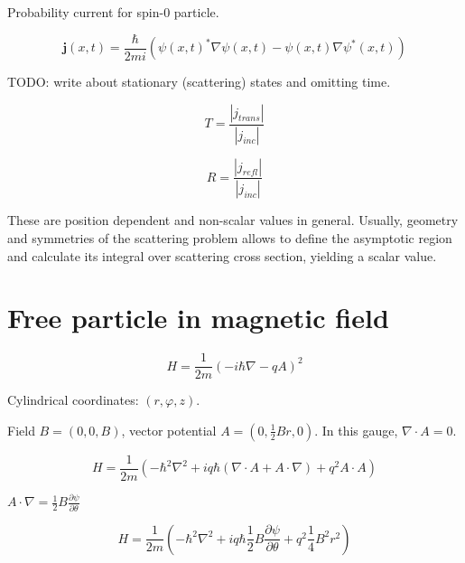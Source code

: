 \documentclass[12pt, a4paper]{article}
\begin{document}
Probability current for spin-0 particle.


$$\bm{j}(x, t) = \frac{\hbar}{2 m i} (\psi(x, t)^* \nabla \psi(x, t) - \psi(x, t) \nabla \psi^*(x, t))$$

TODO: write about stationary (scattering) states and omitting time.

$$T = \frac{|j_{trans}|}{|j_{inc}|}$$

$$R = \frac{|j_{refl}|}{|j_{inc}|}$$

These are position dependent and non-scalar values in general. Usually, geometry and symmetries of the scattering problem allows to define the asymptotic region and calculate its integral over scattering cross section, yielding a scalar value.

\section{Free particle in magnetic field}
$$H = \frac{1}{2m} (- i \hbar \nabla - q A)^2$$


Cylindrical coordinates: $(r, \varphi, z)$.

Field $B = (0, 0, B)$, vector potential $A = (0, \frac{1}{2} B r, 0)$. In this gauge, $\nabla \cdot A = 0$.

$$H = \frac{1}{2m}( - \hbar^2 \nabla^2 + i q \hbar (\nabla \cdot A + A \cdot \nabla) + q^2 A \cdot A)$$

$A \cdot \nabla = \frac{1}{2} B \frac{\partial \psi}{\partial \theta}$

$$H = \frac{1}{2m} (- \hbar^2 \nabla^2 + i q \hbar \frac{1}{2} B \frac{\partial \psi}{\partial \theta} + q^2 \frac{1}{4} B^2 r^2)$$
\end{document}

